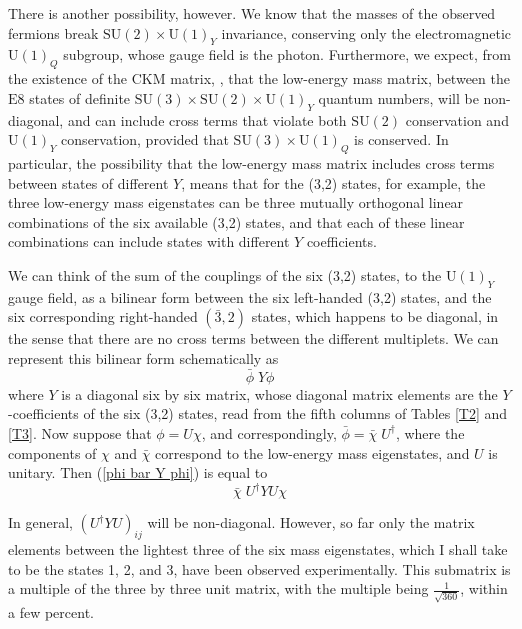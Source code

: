 \documentclass[a4paper,12pt,oneside]{article}
\begin{document}
There is another possibility, however.  We know that the masses of
the observed fermions break $\mathrm{SU}(2)\times\mathrm{U}(1)_Y$
invariance, conserving only the electromagnetic $\mathrm{U}(1)_Q$
subgroup, whose gauge field is the photon.  Furthermore, we expect,
from the existence of the CKM matrix, \cite{Cabibbo, KM, Rosner},
that the low-energy mass matrix, between the $\mathrm{E}8$ states 
of definite 
$\mathrm{SU}(3)\times\mathrm{SU}(2)\times\mathrm{U}(1)_Y$ quantum 
numbers, will be non-diagonal, and can include cross terms that violate both $\mathrm{SU}(2)$ conservation and $\mathrm{U}(1)_Y$
conservation, provided that $\mathrm{SU}(3)\times\mathrm{U}(1)_Q$ is
conserved.  In particular, the possibility that the low-energy mass
matrix includes cross terms between states of different $Y$, means
that for the (3,2) states, for example, the three low-energy mass
eigenstates can be three mutually orthogonal linear combinations of
the six available (3,2) states, and that each of these linear
combinations can include states with different $Y$ coefficients.

We can think of the sum of the couplings of the six (3,2) states, 
to the $\mathrm{U}(1)_Y$ gauge field, as a bilinear form between 
the six left-handed (3,2) states, and the six corresponding 
right-handed
$(\bar{3},2)$ states, which happens to be diagonal, in the sense 
that there are no cross terms between the different multiplets.  We
can represent this bilinear form schematically as
\begin{equation}\label{phi bar Y phi}
\bar{\phi}\;Y\phi
\end{equation}
where $Y$ is a diagonal six by six matrix, whose diagonal matrix
elements are the $Y$-coefficients of the six (3,2) states, read from
the fifth columns of Tables \ref{T2} and \ref{T3}.  Now suppose that
$\phi=U\chi$, and correspondingly, $\bar{\phi}=\bar{\chi}\;U^\dag$,
where the components of $\chi$ and $\bar{\chi}$ correspond to the
low-energy mass eigenstates, and $U$ is unitary.  Then
(\ref{phi bar Y phi}) is equal to 
\begin{equation}\label{chi bar U dag Y U chi}
\bar{\chi}\;U^\dag YU\chi
\end{equation}

In general, $\left(U^\dag YU\right)_{ij}$ will be non-diagonal.
However, so far only the matrix
elements between the lightest three of the six mass eigenstates,
which I shall take to be the states 1, 2, and 3, have been observed 
experimentally.  This 
submatrix is a multiple of the three by
three unit matrix, with the multiple being $\frac{1}{\sqrt{360}}$,
within a few percent.
\end{document}
